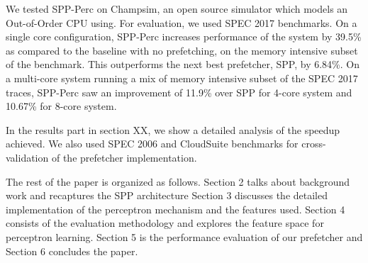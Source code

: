 We tested SPP-Perc on Champsim, an open source simulator which models
an Out-of-Order CPU using.  For evaluation, we used SPEC 2017
benchmarks.  On a single core configuration, SPP-Perc increases
performance of the system by 39.5\% as compared to the baseline with
no prefetching, on the memory intensive subset of the benchmark.  This
outperforms the next best prefetcher, SPP, by 6.84\%.  On a multi-core
system running a mix of memory intensive subset of the SPEC 2017
traces, SPP-Perc saw an improvement of 11.9\% over SPP for 4-core
system and 10.67\% for 8-core system.

In the results part in section XX, we show a detailed analysis of the
speedup achieved.  We also used SPEC 2006 and CloudSuite benchmarks
for cross-validation of the prefetcher implementation.

The rest of the paper is organized as follows.  Section 2 talks about
background work and recaptures the SPP architecture Section 3
discusses the detailed implementation of the perceptron mechanism and
the features used.  Section 4 consists of the evaluation methodology
and explores the feature space for perceptron learning.  Section 5 is
the performance evaluation of our prefetcher and Section 6 concludes
the paper.
